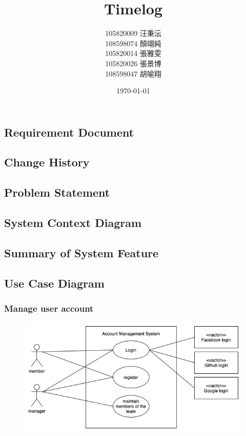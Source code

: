 \documentclass[12pt, a4paper]{article}
\title{Timelog}
\author{105820009 汪秉沄\\
108598074 顏翊純\\
105820014 張雅雯\\
105820026 張景博\\
108598047 胡喻翔}
\date{\today}
\begin{document}
\begin{CJK*}{UTF8}{bkai}
\maketitle
\newpage

\tableofcontents
\newpage


\section{Requirement Document}
  \subsection{Change History}

  \subsection{Problem Statement}

  \subsection{System Context Diagram}

  \subsection{Summary of System Feature}

  \subsection{Use Case Diagram}
    \subsubsection{Manage user account}
      \begin{figure}[h!]
        \centering
        \includegraphics[width=\linewidth]{img/usecase_diagram/manage_user_account.png}
      \end{figure}


\end{CJK*}
\end{document}
